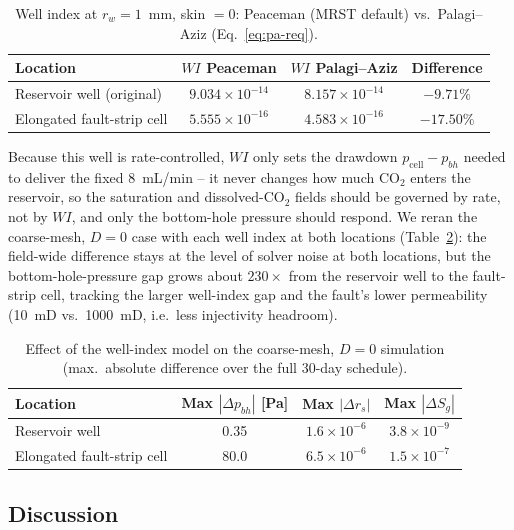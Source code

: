 \documentclass[preprint,11pt]{elsarticle}
\begin{document}
\begin{table}[tb]
\centering
\caption{Well index at $r_w=1$~mm, skin $=0$: Peaceman (MRST default)
vs.\ Palagi--Aziz (Eq.~\ref{eq:pa-req}).}
\label{tab:wi}
\begin{tabular}{lccc}
\toprule
Location & $WI$ Peaceman & $WI$ Palagi--Aziz & Difference \\
\midrule
Reservoir well (original)  & $9.034\times10^{-14}$ & $8.157\times10^{-14}$ & $-9.71\%$ \\
Elongated fault-strip cell & $5.555\times10^{-16}$ & $4.583\times10^{-16}$ & $-17.50\%$ \\
\bottomrule
\end{tabular}
\end{table}

Because this well is rate-controlled, $WI$ only sets the drawdown
$p_{\mathrm{cell}}-p_{bh}$ needed to deliver the fixed 8~mL/min --
it never changes how much CO$_2$ enters the reservoir, so the
saturation and dissolved-CO$_2$ fields should be governed by rate, not by
$WI$, and only the bottom-hole pressure should respond. We reran the
coarse-mesh, $D=0$ case with each well index at both locations
(Table~\ref{tab:wi-effect}): the field-wide difference stays at the level
of solver noise at both locations, but the bottom-hole-pressure gap grows
about $230\times$ from the reservoir well to the fault-strip cell,
tracking the larger well-index gap and the fault's lower permeability
(10~mD vs.\ 1000~mD, i.e.\ less injectivity headroom).

\begin{table}[tb]
\centering
\caption{Effect of the well-index model on the coarse-mesh, $D=0$
simulation (max.\ absolute difference over the full 30-day schedule).}
\label{tab:wi-effect}
\begin{tabular}{lccc}
\toprule
Location & Max $|\Delta p_{bh}|$ [Pa] & Max $|\Delta r_s|$ & Max $|\Delta S_g|$ \\
\midrule
Reservoir well              & 0.35 & $1.6\times10^{-6}$ & $3.8\times10^{-9}$ \\
Elongated fault-strip cell  & 80.0 & $6.5\times10^{-6}$ & $1.5\times10^{-7}$ \\
\bottomrule
\end{tabular}
\end{table}

\subsection{Discussion}
\end{document}
